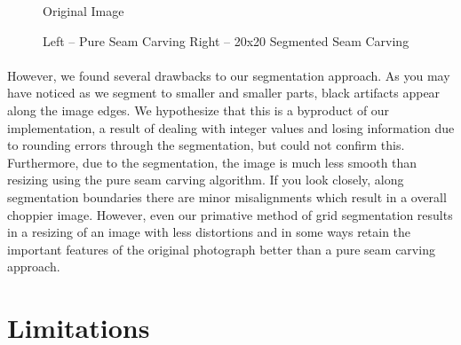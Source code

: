 \documentclass[conference]{acmsiggraph}
\begin{document}
\begin{figure}[ht]       
    \centering
    \caption{Original Image}
    \label{fig:leopard_lady}

\end{figure}
\begin{figure}[ht]       
    \caption{Left -- Pure Seam Carving Right -- 20x20 Segmented Seam Carving}
    \label{fig:leopard_lady_compare}
\end{figure}




\paragraph{}

However, we found several drawbacks to our segmentation approach.  As you may have noticed as we segment to smaller and smaller parts, black artifacts appear along the image edges. We hypothesize that this is a byproduct of our implementation, a result of dealing with integer values and losing information due to rounding errors through the segmentation, but could not confirm this.  Furthermore, due to the segmentation, the image is much less smooth than resizing using the pure seam carving algorithm.  If you look closely, along segmentation boundaries there are minor misalignments which result in a overall choppier image.   However, even our primative method of grid segmentation results in a resizing of an image with less distortions and in some ways retain the important features of the original photograph better than a pure seam carving approach.


\section{Limitations}
\end{document}
